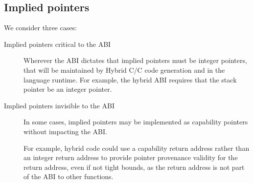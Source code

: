 \documentclass[12pt,twoside,openright,a4paper]{article}
\newcommand{\ccode}[1]{{\small\ttfamily{#1}}}
\newcommand{\cfunc}[1]{{\ccode{#1()}}}
\newcommand{\uucap}{{\ccode{\_\_capability}}\xspace}
\newcommand{\futurevariant}[1]{{\color{purple} #1}}
\newcommand{\note}[2]{{\color{blue}[ Note: #1 - #2]}}
\renewcommand{\note}[2]{\relax\ifhmode\unskip\fi}
\newcommand{\rwnote}[1]{\note{#1}{Robert W.}}
\newcommand{\psnote}[1]{\note{#1}{Peter S.}}
\newcommand{\jrtcnote}[1]{\note{#1}{Jess C.}}
\newcommand{\dcnote}[1]{\note{#1}{David}}
\newcommand*{\cpp}{\texorpdfstring{C\textsmaller[2]{\protect\nolinebreak[4]\hspace{-.05em}\raisebox{.45ex}{\textbf{++}}}}{C++}}
\newcommand*{\COrCpp}{C/\cpp{}}
\newcommand*{\hybridCOrCpp}{Hybrid \COrCpp{}}
\begin{document}
\rwnote{Do we want a new item, ``Implied pointers that have a limited impact
  on ABI''?  E.g., to capture the CRA case?}

\rwnote{Have we gotten too researchy here, and we should just stick to the
  simple story that only those tagged with \uucap{} matter.
  I seem to recall that we also have a pragma for managing the default
  interpretation to be used in header files shared between interpretations...}

\subsection{Implied pointers}

We consider three cases:

\begin{description}
\item[Implied pointers critical to the ABI]
  Wherever the ABI dictates that implied pointers must be integer pointers,
  that will be maintained by \hybridCOrCpp{} code generation and in the
  language runtime.
  For example, the hybrid ABI requires that the stack pointer be an integer
  pointer.
  \dcnote{This isn't clear to me as a general point.  An ISA that had an
    architectural stack pointer could have a stack capability and define the
    legacy ops that write an integer to the stack pointer to set the address.
    We couldn't do that on MIPS because the stack pointer is non-architectural
    but it would be possible on ARM.}

\item[Implied pointers invisible to the ABI]
  In some cases, implied pointers may be implemented as capability pointers
  without impacting the ABI.

\psnote{again flag more clearly that this is speculative?  The blue colour alone isn't doing it for me}
  
  \futurevariant{For example, hybrid code could use a capability return address
  rather than an integer return address to provide pointer provenance validity
  for the return address, even if not tight bounds, as the return address is
  not part of the ABI to other functions.}

  \jrtcnote{\cfunc{\_\_builtin\_return\_address} does leak these implied
  pointers to some code, and it has implications for things like libunwind, so
  it does affect the ABI. Also the kernel needs to know to put a capability in
  CRA in order for signal handlers to be able to return to \cfunc{sigcode}.
  There's a lot of subtlety here that needs to be captured.}


\end{description}
\end{document}
